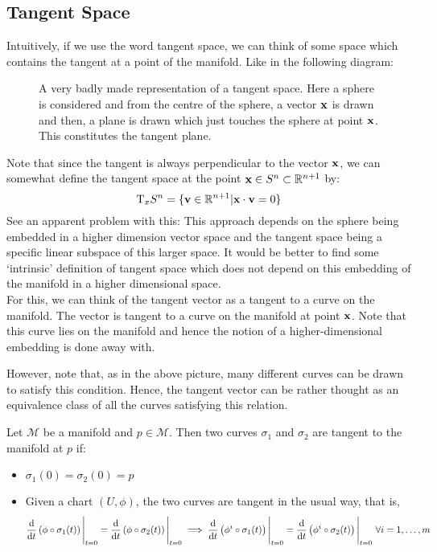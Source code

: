 \subsection{Tangent Space}
Intuitively, if we use the word tangent space, we can think of some space which contains the tangent at a point of the manifold. Like in the following diagram: 
\begin{figure}[H]
  \centering 
  
  \caption{A very badly made representation of a tangent space. Here a sphere is considered and from the centre of the sphere, a vector $\boldsymbol{\mathbf{x}}$ is drawn and then, a plane is drawn which just touches the sphere at point $\boldsymbol{\mathbf{x}}$. This constitutes the tangent plane. }
\end{figure}
\noindent
Note that since the tangent is always perpendicular to the vector $\boldsymbol{\mathbf{x}}$, we can somewhat define the tangent space at the point $\boldsymbol{\mathbf{x}}\in S^n \subset \mathbb{R}^{n+1}$ by: $$\mathrm{T}_{x}S^n = \{\boldsymbol{\mathbf{v}}\in \mathbb{R}^{n+1}| \boldsymbol{\mathbf{x}}\cdot \boldsymbol{\mathbf{v}} = 0\}$$
See an apparent problem with this: This approach depends on the sphere being embedded in a higher dimension vector space and the tangent space being a specific linear subspace of this larger space. It would be better to find some `intrinsic' definition of tangent space which does not depend on this embedding of the manifold in a higher dimensional space.\\[0.3cm]
For this, we can think of the tangent vector as a tangent to a curve on the manifold. The vector is tangent to a curve on the manifold at point $\boldsymbol{\mathbf{x}}$. Note that this curve lies on the manifold and hence the notion of a higher-dimensional embedding is done away with. 
\begin{figure}[H]
  \centering
  
\end{figure}
\noindent
However, note that, as in the above picture, many different curves can be drawn to satisfy this condition. Hence, the tangent vector can be rather thought as an equivalence class of all the curves satisfying this relation. 
\begin{definition}[Tangent]
  Let $\mathcal{M}$ be a manifold and $p\in \mathcal{M}$. Then two curves $\sigma_1$ and $\sigma_2$ are tangent to the manifold at $p$ if:
  \begin{itemize}
    \item $\sigma_1(0) = \sigma_2(0) = p$
    \item Given a chart $(U,\phi)$, the two curves are tangent in the usual way, that is, 
    {\small
$$\dv{t}\left( \phi\circ\sigma_1(t) \right)\Bigg|_{t=0} =\dv{t}\left( \phi\circ\sigma_2(t) \right)\Bigg|_{t=0} \implies \dv{t}\left( \phi^i\circ\sigma_1(t) \right)\Bigg|_{t=0} =\dv{t}\left( \phi^i\circ\sigma_2(t) \right)\Bigg|_{t=0}  \ \forall i = 1,\ldots, m$$
}
  \end{itemize}
  
\end{definition}
